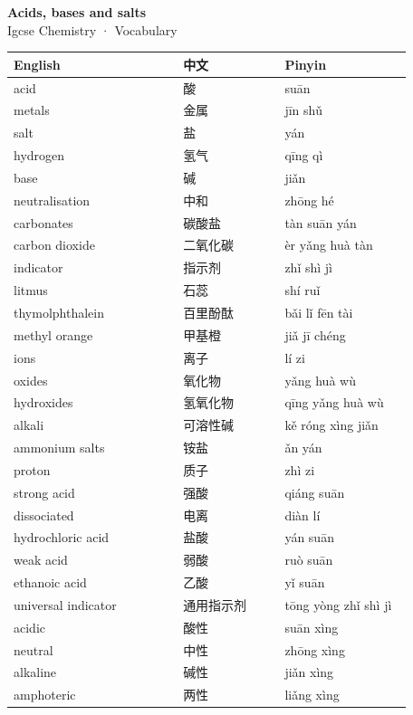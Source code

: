 \documentclass[11pt]{article}
\begin{document}
\begin{center}
  {\LARGE\bfseries Acids, bases and salts}\\[0.35em]
  {\large Igcse Chemistry · Vocabulary}
\end{center}
\vspace{0.6em}

\begin{longtable}{@{}p{0.40\linewidth}p{0.24\linewidth}p{0.30\linewidth}@{}}
\toprule
\textbf{English} & \textbf{中文} & \textbf{Pinyin} \\
\midrule
\endhead
\bottomrule
\endlastfoot
acid & 酸 & suān \\
metals & 金属 & jīn shǔ \\
salt & 盐 & yán \\
hydrogen & 氢气 & qīng qì \\
base & 碱 & jiǎn \\
neutralisation & 中和 & zhōng hé \\
carbonates & 碳酸盐 & tàn suān yán \\
carbon dioxide & 二氧化碳 & èr yǎng huà tàn \\
indicator & 指示剂 & zhǐ shì jì \\
litmus & 石蕊 & shí ruǐ \\
thymolphthalein & 百里酚酞 & bǎi lǐ fēn tài \\
methyl orange & 甲基橙 & jiǎ jī chéng \\
ions & 离子 & lí zi \\
oxides & 氧化物 & yǎng huà wù \\
hydroxides & 氢氧化物 & qīng yǎng huà wù \\
alkali & 可溶性碱 & kě róng xìng jiǎn \\
ammonium salts & 铵盐 & ǎn yán \\
proton & 质子 & zhì zi \\
strong acid & 强酸 & qiáng suān \\
dissociated & 电离 & diàn lí \\
hydrochloric acid & 盐酸 & yán suān \\
weak acid & 弱酸 & ruò suān \\
ethanoic acid & 乙酸 & yǐ suān \\
universal indicator & 通用指示剂 & tōng yòng zhǐ shì jì \\
acidic & 酸性 & suān xìng \\
neutral & 中性 & zhōng xìng \\
alkaline & 碱性 & jiǎn xìng \\
amphoteric & 两性 & liǎng xìng \\

\end{longtable}
\end{document}
